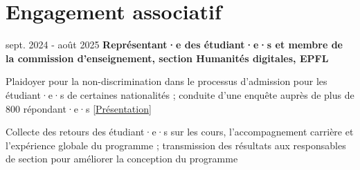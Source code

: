 \section{Engagement associatif}

        \begin{twocolentry}[3.5 cm]{
            sept. 2024 - août 2025
        }
            \textbf{Représentant·e des étudiant·e·s et membre de la commission d'enseignement, section Humanités digitales, EPFL}\end{twocolentry}

        \vspace{0.10 cm}
        \begin{onecolentry}
            \begin{highlights}
                \item Plaidoyer pour la non-discrimination dans le processus d'admission pour les étudiant·e·s de certaines nationalités ; conduite d'une enquête auprès de plus de 800 répondant·e·s [\href{https://renyi.ch/reports/dh-student-rep-survey.pdf}{Présentation}]
                \item Collecte des retours des étudiant·e·s sur les cours, l'accompagnement carrière et l'expérience globale du programme ; transmission des résultats aux responsables de section pour améliorer la conception du programme
            \end{highlights}
        \end{onecolentry}


